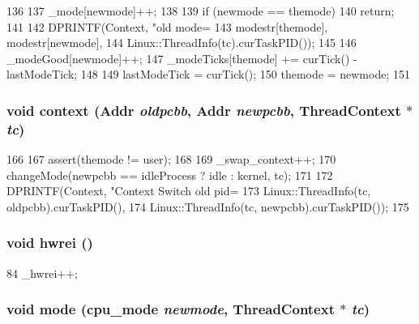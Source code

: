 \begin{DoxyCode}
136 {
137     _mode[newmode]++;
138 
139     if (newmode == themode)
140         return;
141 
142     DPRINTF(Context, "old mode=%
143             modestr[themode], modestr[newmode],
144             Linux::ThreadInfo(tc).curTaskPID());
145 
146     _modeGood[newmode]++;
147     _modeTicks[themode] += curTick() - lastModeTick;
148 
149     lastModeTick = curTick();
150     themode = newmode;
151 }
\end{DoxyCode}
\hypertarget{classAlphaISA_1_1Kernel_1_1Statistics_a142daab47c3cbc51299f94f8d0262cfb}{
\subsubsection[{context}]{\setlength{\rightskip}{0pt plus 5cm}void context ({\bf Addr} {\em oldpcbb}, \/  {\bf Addr} {\em newpcbb}, \/  {\bf ThreadContext} $\ast$ {\em tc})}}
\label{classAlphaISA_1_1Kernel_1_1Statistics_a142daab47c3cbc51299f94f8d0262cfb}



\begin{DoxyCode}
166 {
167     assert(themode != user);
168 
169     _swap_context++;
170     changeMode(newpcbb == idleProcess ? idle : kernel, tc);
171 
172     DPRINTF(Context, "Context Switch old pid=%
173             Linux::ThreadInfo(tc, oldpcbb).curTaskPID(),
174             Linux::ThreadInfo(tc, newpcbb).curTaskPID());
175 }
\end{DoxyCode}
\hypertarget{classAlphaISA_1_1Kernel_1_1Statistics_a533ed6061eb53157e53d902560bd6d0e}{
\subsubsection[{hwrei}]{\setlength{\rightskip}{0pt plus 5cm}void hwrei ()}}
\label{classAlphaISA_1_1Kernel_1_1Statistics_a533ed6061eb53157e53d902560bd6d0e}



\begin{DoxyCode}
84 { _hwrei++; }
\end{DoxyCode}
\hypertarget{classAlphaISA_1_1Kernel_1_1Statistics_a69a28205bda54bb9952d3bfd3aa2b432}{
\subsubsection[{mode}]{\setlength{\rightskip}{0pt plus 5cm}void mode ({\bf cpu\_\-mode} {\em newmode}, \/  {\bf ThreadContext} $\ast$ {\em tc})}}
\label{classAlphaISA_1_1Kernel_1_1Statistics_a69a28205bda54bb9952d3bfd3aa2b432}



